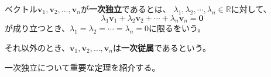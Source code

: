 \documentclass{jlreq}
\begin{document}
\begin{definitionbox}[一次独立と一次従属]
  ベクトル$\boldsymbol{v}_1, \boldsymbol{v}_2, \ldots, \boldsymbol{v}_n$が\textbf{一次独立}であるとは、
  $\lambda_1, \lambda_2, \cdots, \lambda_n \in \mathbb{R}$に対して、
  \begin{equation*}
    \lambda_1 \boldsymbol{v}_1 + \lambda_2 \boldsymbol{v}_2 + \cdots + \lambda_n \boldsymbol{v}_n = \boldsymbol{0}
  \end{equation*}
  が成り立つとき、$\lambda_1 = \lambda_2 = \cdots = \lambda_n = 0$に限るをいう。

  それ以外のとき、$\boldsymbol{v}_1, \boldsymbol{v}_2, \ldots, \boldsymbol{v}_n$は\textbf{一次従属}であるという。
\end{definitionbox}

一次独立について重要な定理を紹介する。
\end{document}
